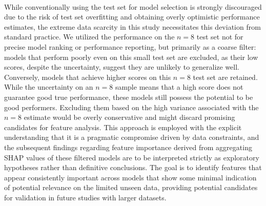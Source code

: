 \documentclass[12pt,a4paper]{report}
\newcommand{\todo}[1]{%
  \par\noindent%
  \begin{tcolorbox}[colback=yellow, colframe=black, boxrule=0.5pt, sharp corners, width=\linewidth, before skip=5pt, after skip=5pt]
    \textbf{TODO:} #1
  \end{tcolorbox}%
  \par
}
\begin{document}
\\
While conventionally using the test set for model selection is strongly discouraged due to the risk of test set overfitting and obtaining overly optimistic performance estimates, the extreme data scarcity in this study necessitates this deviation from standard practice. We utilized the performance on the $n=8$ test set not for precise model ranking or performance reporting, but primarily as a coarse filter: models that perform poorly even on this small test set are excluded, as their low scores, despite the uncertainty, suggest they are unlikely to generalize well. Conversely, models that achieve higher scores on this $n=8$ test set are retained. While the uncertainty on an $n=8$ sample means that a high score does not guarantee good true performance, these models still possess the potential to be good performers. Excluding them based on the high variance associated with the $n=8$ estimate would be overly conservative and might discard promising candidates for feature analysis. This approach is employed with the explicit understanding that it is a pragmatic compromise driven by data constraints, and the subsequent findings regarding feature importance derived from aggregating SHAP values of these filtered models are to be interpreted strictly as exploratory hypotheses rather than definitive conclusions. The goal is to identify features that appear consistently important across models that show some minimal indication of potential relevance on the limited unseen data, providing potential candidates for validation in future studies with larger datasets.






\end{document}
